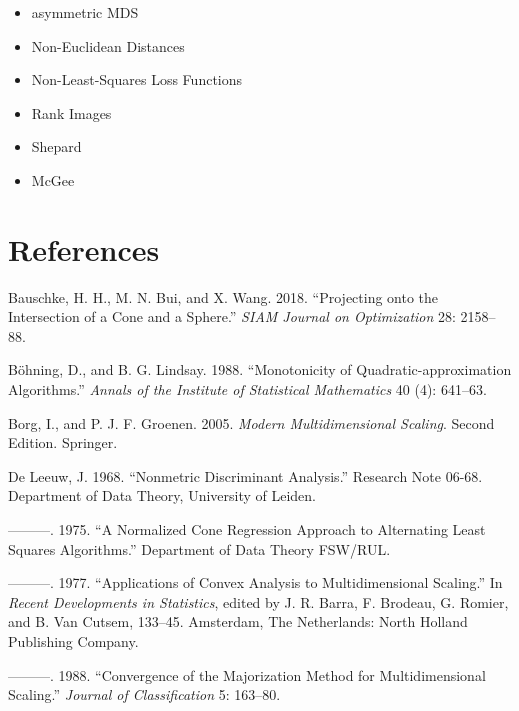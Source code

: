 \documentclass[
  12pt,
]{article}
\providecommand{\tightlist}{%
  \setlength{\itemsep}{0pt}\setlength{\parskip}{0pt}}
\newlength{\cslhangindent}
\newenvironment{CSLReferences}[2] %
 {\begin{list}{}{%
  \setlength{\itemindent}{0pt}
  \setlength{\leftmargin}{0pt}
  \setlength{\parsep}{0pt}
  \ifodd #1
   \setlength{\leftmargin}{\cslhangindent}
   \setlength{\itemindent}{-1\cslhangindent}
  \fi
  \setlength{\itemsep}{#2\baselineskip}}}
 {\end{list}}
\begin{document}
\begin{itemize}
\tightlist
\item
  asymmetric MDS
\item
  Non-Euclidean Distances
\item
  Non-Least-Squares Loss Functions
\item
  Rank Images
\item
  Shepard
\item
  McGee
\end{itemize}

\section*{References}\label{references}

\label{refs}
\begin{CSLReferences}{1}{0}
Bauschke, H. H., M. N. Bui, and X. Wang. 2018. {``{Projecting onto the Intersection of a Cone and a Sphere}.''} \emph{SIAM Journal on Optimization} 28: 2158--88.

Böhning, D., and B. G. Lindsay. 1988. {``{Monotonicity of Quadratic-approximation Algorithms}.''} \emph{Annals of the Institute of Statistical Mathematics} 40 (4): 641--63.

Borg, I., and P. J. F. Groenen. 2005. \emph{Modern Multidimensional Scaling}. Second Edition. Springer.

De Leeuw, J. 1968. {``Nonmetric Discriminant Analysis.''} Research Note 06-68. Department of Data Theory, University of Leiden.

---------. 1975. {``{A Normalized Cone Regression Approach to Alternating Least Squares Algorithms}.''} Department of Data Theory FSW/RUL.

---------. 1977. {``Applications of Convex Analysis to Multidimensional Scaling.''} In \emph{Recent Developments in Statistics}, edited by J. R. Barra, F. Brodeau, G. Romier, and B. Van Cutsem, 133--45. Amsterdam, The Netherlands: North Holland Publishing Company.

---------. 1988. {``Convergence of the Majorization Method for Multidimensional Scaling.''} \emph{Journal of Classification} 5: 163--80.


\end{CSLReferences}
\end{document}
